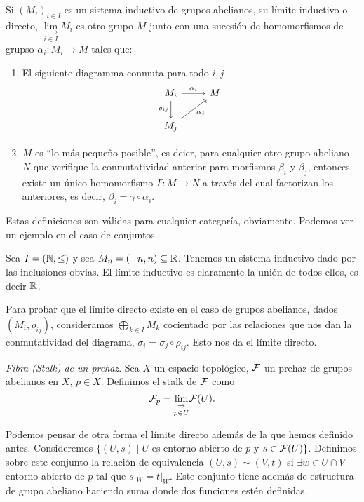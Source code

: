 \documentclass[GA.tex]{subfiles}
\begin{document}
Si $(M_i)_{i\in I}$ es un sistema inductivo de grupos abelianos, su límite inductivo o directo, $\underset{i\in I}{\underset{\rightarrow}{\lim}}M_i$ es otro grupo $M$ junto con una sucesión de homomorfismos de grupso $\alpha_i:M_i\to M$ tales que:
\begin{enumerate}
\item El siguiente diagramma conmuta para todo $i,j$
\[
\begin{tikzcd}
M_i\arrow[r, "\alpha_i"]\arrow[d, "\rho_{ij}"'] & M\\
M_j\arrow[ur, "\alpha_j"'] &
\end{tikzcd}
\]
\item $M$ es ``lo más pequeño posible'', es deicr, para cualquier otro grupo abeliano $N$ que verifique la conmutatividad anterior para morfismos $\beta_i$ y $\beta_j$, entonces existe un único homomorfismo $\Gamma:M\to N$ a través del cual factorizan los anteriores, es decir, $\beta_i=\gamma\circ\alpha_i$. 
\end{enumerate} 

Estas definiciones son válidas para cualquier categoría, obviamente. Podemos ver un ejemplo en el caso de conjuntos. 

\begin{ej}
Sea $I=(\mathbb{N}, \leq)$ y sea $M_n=(-n,n)\subseteq\mathbb{R}$. Tenemos un sistema inductivo dado por las inclusiones obvias. El límite inductivo es claramente la unión de todos ellos, es decir $\mathbb{R}$. 
\end{ej}

Para probar que el límite directo existe en el caso de grupos abelianos, dados $(M_i,\rho_{ij})$, consideramos $\bigoplus_{k\in I}M_k$ cocientado por las relaciones que nos dan la conmutatividad del diagrama, $\sigma_i=\sigma_j\circ \rho_{ij}$. Esto nos da el límite directo.


\begin{defi}
\emph{Fibra (Stalk) de un prehaz}. Sea $X$ un espacio topológico, $\mathcal{F}$ un prehaz de grupos abelianos en $X$, $p\in X$. Definimos el stalk de $\mathcal{F}$ como
\[
\mathcal{F}_p=\underset{p\in U}{\underset{\rightarrow}{\lim}} \mathcal{F}(U).
\]
\end{defi}

Podemos pensar de otra forma el límite directo además de la que hemos definido antes. Consideremos $\{(U,s)\mid U$ es entorno abierto de $p$ y $s\in\mathcal{F}(U)\}$. Definimos sobre este conjunto la relación de equivalencia $(U,s)\sim (V,t)$ si $\exists w\in U\cap V$ entorno abierto de $p$ tal que $s|_W=t|_W$. Este conjunto tiene además de estructura de grupo abeliano haciendo suma donde dos funciones estén definidas. 
\end{document}
